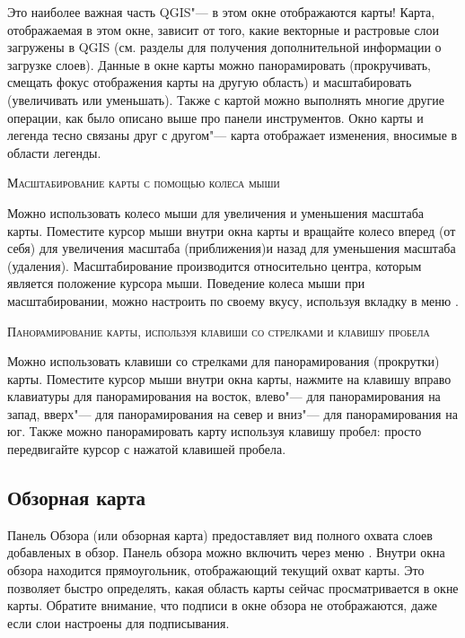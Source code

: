 Это наиболее важная часть QGIS"--- в этом окне отображаются карты! Карта,
отображаемая в этом окне, зависит от того, какие векторные и растровые
слои загружены в QGIS (см. разделы для получения дополнительной информации
о загрузке слоев). Данные в окне карты можно панорамировать (прокручивать,
смещать фокус отображения карты на другую область) и масштабировать
(увеличивать или уменьшать). Также с картой можно выполнять многие другие
операции, как было описано выше про панели инструментов. Окно карты и
легенда тесно связаны друг с другом"--- карта отображает изменения,
вносимые в области легенды.

\begin{Tip}\caption{\textsc{Масштабирование карты с помощью колеса мыши}}
Можно использовать колесо мыши для увеличения и уменьшения масштаба карты.
Поместите курсор мыши внутри окна карты и вращайте колесо вперед (от себя)
для увеличения масштаба (приближения)и назад для уменьшения масштаба
(удаления). Масштабирование производится относительно центра, которым
является положение курсора мыши. Поведение колеса мыши при масштабировании,
можно настроить по своему вкусу, используя вкладку  в
меню  \arrow {}.
\end{Tip}

\begin{Tip}\caption{\textsc{Панорамирование карты, используя клавиши
со стрелками и клавишу пробела}}
Можно использовать клавиши со стрелками для панорамирования (прокрутки)
карты. Поместите курсор мыши внутри окна карты, нажмите на клавишу вправо
клавиатуры для панорамирования на восток, влево"--- для панорамирования
на запад, вверх"--- для панорамирования на север и вниз"--- для
панорамирования на юг. Также можно панорамировать карту используя клавишу
пробел: просто передвигайте курсор с нажатой клавишей пробела.
\end{Tip}

\subsection{Обзорная карта}\label{label_mapoverview}

Панель Обзора (или обзорная карта) предоставляет вид полного охвата слоев
добавленых в обзор. Панель обзора можно включить через меню
 \arrow {}. Внутри окна обзора
находится прямоугольник, отображающий текущий охват карты. Это позволяет
быстро определять, какая область карты сейчас просматривается в окне
карты. Обратите внимание, что подписи в окне обзора не отображаются,
даже если слои настроены для подписывания.

